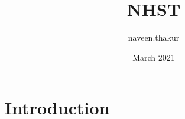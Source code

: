 \documentclass{article}
\title{NHST}
\author{naveen.thakur }
\date{March 2021}
\begin{document}
\maketitle

\section{Introduction}
\end{document}
